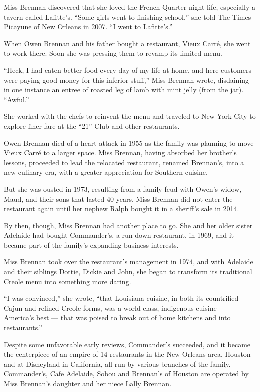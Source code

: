 Miss Brennan discovered that she loved the French Quarter night life,
especially a tavern called Lafitte's. ``Some girls went to finishing
school,'' she told The Times-Picayune of New Orleans in 2007. ``I went
to Lafitte's.''

When Owen Brennan and his father bought a restaurant, Vieux Carré, she
went to work there. Soon she was pressing them to revamp its limited
menu.

``Heck, I had eaten better food every day of my life at home, and here
customers were paying good money for this inferior stuff,'' Miss Brennan
wrote, disdaining in one instance an entree of roasted leg of lamb with
mint jelly (from the jar). ``Awful.''

She worked with the chefs to reinvent the menu and traveled to New York
City to explore finer fare at the ``21'' Club and other restaurants.

Owen Brennan died of a heart attack in 1955 as the family was planning
to move Vieux Carré to a larger space. Miss Brennan, having absorbed her
brother's lessons, proceeded to lead the relocated restaurant, renamed
Brennan's, into a new culinary era, with a greater appreciation for
Southern cuisine.

But she was ousted in 1973, resulting from a family feud with Owen's
widow, Maud, and their sons that lasted 40 years. Miss Brennan did not
enter the restaurant again until her nephew Ralph bought it in a
sheriff's sale in 2014.

By then, though, Miss Brennan had another place to go. She and her older
sister Adelaide had bought Commander's, a run-down restaurant, in 1969,
and it became part of the family's expanding business interests.

Miss Brennan took over the restaurant's management in 1974, and with
Adelaide and their siblings Dottie, Dickie and John, she began to
transform its traditional Creole menu into something more daring.

``I was convinced,'' she wrote, ``that Louisiana cuisine, in both its
countrified Cajun and refined Creole forms, was a world-class,
indigenous cuisine --- America's best --- that was poised to break out
of home kitchens and into restaurants.''

Despite some unfavorable early reviews, Commander's succeeded, and it
became the centerpiece of an empire of 14 restaurants in the New Orleans
area, Houston and at Disneyland in California, all run by various
branches of the family. Commander's, Cafe Adelaide, Sobou and Brennan's
of Houston are operated by Miss Brennan's daughter and her niece Lally
Brennan.


